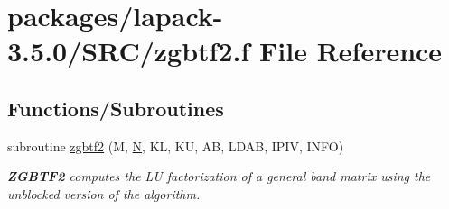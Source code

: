 \hypertarget{zgbtf2_8f}{}\section{packages/lapack-\/3.5.0/\+S\+R\+C/zgbtf2.f File Reference}
\label{zgbtf2_8f}
\subsection*{Functions/\+Subroutines}
\begin{DoxyCompactItemize}
\item 
subroutine \hyperlink{group__complex16GBcomputational_ga06753b5d5c8432fbb7009909d321cdd0}{zgbtf2} (M, \hyperlink{polmisc_8c_a0240ac851181b84ac374872dc5434ee4}{N}, K\+L, K\+U, A\+B, L\+D\+A\+B, I\+P\+I\+V, I\+N\+F\+O)
\begin{DoxyCompactList}\small\item\em {\bfseries Z\+G\+B\+T\+F2} computes the L\+U factorization of a general band matrix using the unblocked version of the algorithm. \end{DoxyCompactList}\end{DoxyCompactItemize}
